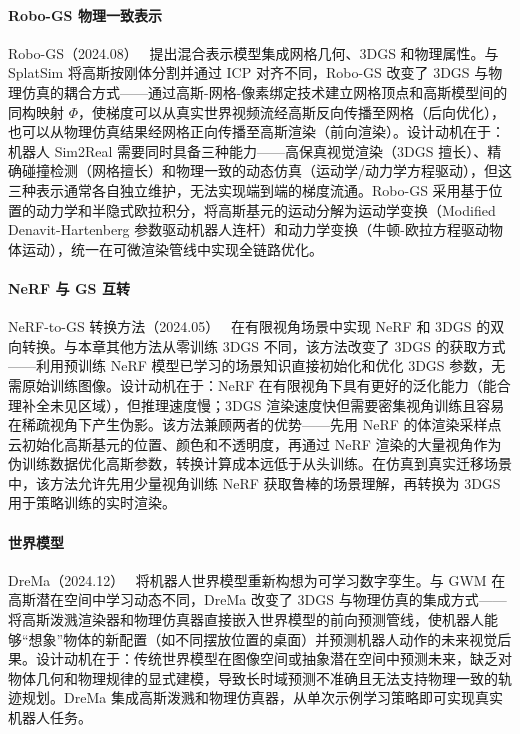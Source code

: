 \paragraph{Robo-GS 物理一致表示}

Robo-GS（2024.08）~\cite{2408_14873} 提出混合表示模型集成网格几何、3DGS 和物理属性。与 SplatSim 将高斯按刚体分割并通过 ICP 对齐不同，Robo-GS 改变了 3DGS 与物理仿真的耦合方式——通过高斯-网格-像素绑定技术建立网格顶点和高斯模型间的同构映射 $\Phi$，使梯度可以从真实世界视频流经高斯反向传播至网格（后向优化），也可以从物理仿真结果经网格正向传播至高斯渲染（前向渲染）。设计动机在于：机器人 Sim2Real 需要同时具备三种能力——高保真视觉渲染（3DGS 擅长）、精确碰撞检测（网格擅长）和物理一致的动态仿真（运动学/动力学方程驱动），但这三种表示通常各自独立维护，无法实现端到端的梯度流通。Robo-GS 采用基于位置的动力学和半隐式欧拉积分，将高斯基元的运动分解为运动学变换（Modified Denavit-Hartenberg 参数驱动机器人连杆）和动力学变换（牛顿-欧拉方程驱动物体运动），统一在可微渲染管线中实现全链路优化。

\paragraph{NeRF 与 GS 互转}

NeRF-to-GS 转换方法（2024.05）~\cite{2405_09717} 在有限视角场景中实现 NeRF 和 3DGS 的双向转换。与本章其他方法从零训练 3DGS 不同，该方法改变了 3DGS 的获取方式——利用预训练 NeRF 模型已学习的场景知识直接初始化和优化 3DGS 参数，无需原始训练图像。设计动机在于：NeRF 在有限视角下具有更好的泛化能力（能合理补全未见区域），但推理速度慢；3DGS 渲染速度快但需要密集视角训练且容易在稀疏视角下产生伪影。该方法兼顾两者的优势——先用 NeRF 的体渲染采样点云初始化高斯基元的位置、颜色和不透明度，再通过 NeRF 渲染的大量视角作为伪训练数据优化高斯参数，转换计算成本远低于从头训练。在仿真到真实迁移场景中，该方法允许先用少量视角训练 NeRF 获取鲁棒的场景理解，再转换为 3DGS 用于策略训练的实时渲染。

\paragraph{世界模型}

DreMa（2024.12）~\cite{2412_14957} 将机器人世界模型重新构想为可学习数字孪生。与 GWM 在高斯潜在空间中学习动态不同，DreMa 改变了 3DGS 与物理仿真的集成方式——将高斯泼溅渲染器和物理仿真器直接嵌入世界模型的前向预测管线，使机器人能够``想象''物体的新配置（如不同摆放位置的桌面）并预测机器人动作的未来视觉后果。设计动机在于：传统世界模型在图像空间或抽象潜在空间中预测未来，缺乏对物体几何和物理规律的显式建模，导致长时域预测不准确且无法支持物理一致的轨迹规划。DreMa 集成高斯泼溅和物理仿真器，从单次示例学习策略即可实现真实机器人任务。

